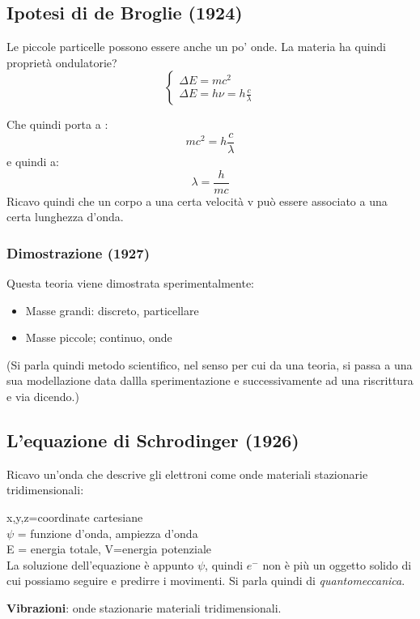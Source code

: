 \subsection{Ipotesi di de Broglie (1924)}
Le piccole particelle possono essere anche un po' onde. La materia ha quindi proprietà ondulatorie? 
\[
\begin{cases}
    \Delta E = mc^{2}\\
    \Delta E = h\nu = h\frac{c}{\lambda} 
\end{cases}
\]

Che quindi porta a : \[mc^{2}=h\frac{c}{\lambda}\] e quindi a: \[\lambda=\frac{h}{mc}\] Ricavo quindi che un corpo a una certa velocità v può essere associato a una certa lunghezza d'onda. 

\subsubsection{Dimostrazione (1927)}
Questa teoria viene dimostrata sperimentalmente: 

\begin{itemize}
    \item Masse grandi: discreto, particellare
    \item Masse piccole; continuo, onde
\end{itemize}

(Si parla quindi metodo scientifico, nel senso per cui da una teoria, si passa a una sua modellazione data dallla sperimentazione e successivamente ad una riscrittura e via dicendo.)

\subsection{L'equazione di Schrodinger (1926)}
Ricavo un'onda che descrive gli elettroni come onde materiali stazionarie tridimensionali: 


x,y,z=coordinate cartesiane \\
$\psi$ = funzione d'onda, ampiezza d'onda\\
E = energia totale, V=energia potenziale\\
La soluzione dell'equazione è appunto $\psi$, quindi $e^{-}$ non è più un oggetto solido di cui possiamo seguire e predirre i movimenti. Si parla quindi di \emph{quantomeccanica}. 

\textbf{Vibrazioni}: onde stazionarie materiali tridimensionali. 

